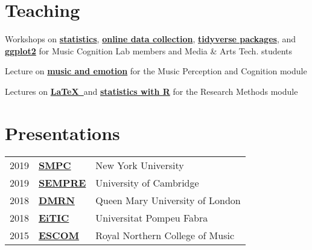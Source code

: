\documentclass[]{deedy-resume-openfont}
\begin{document}
\begin{minipage}[t]{0.66\textwidth}
\section{Teaching}
\begin{tightemize}
\item Workshops on \textbf{\href{https://github.com/remidefleurian/teaching/tree/master/lectures/intro-to-stats}{statistics}}, \textbf{\href{https://github.com/remidefleurian/teaching/tree/master/lectures/online-data-collection}{online data collection}}, \textbf{\href{https://github.com/remidefleurian/teaching/tree/master/lectures/intro-to-tidyverse}{tidyverse packages}}, and \textbf{\href{https://github.com/remidefleurian/teaching/tree/master/lectures/intro-to-ggplot2}{ggplot2}} for Music Cognition Lab members and Media \& Arts Tech. students
\end{tightemize}
\sectionsep

\begin{tightemize}
\item Lecture on \textbf{\href{https://github.com/remidefleurian/teaching/tree/master/lectures/music-and-emotion}{music and emotion}} for the Music Perception and Cognition module
\end{tightemize}
\sectionsep

\begin{tightemize}
\item Lectures on \textbf{\href{https://github.com/remidefleurian/teaching/tree/master/lectures/typesetting-with-latex}{\LaTeX\ }}and \textbf{\href{https://github.com/remidefleurian/teaching/tree/master/lectures/stats-with-r}{statistics with R}} for the Research Methods module
\end{tightemize}
\sectionsep

\section{Presentations} 
\begin{tabular}{rll}
2019 & \textbf{\href{https://remidefleurian.com/presentation/2019-smpc/}{SMPC}} & New York University \\
2019 & \textbf{\href{https://remidefleurian.com/presentation/2019-sempre/}{SEMPRE}} & University of Cambridge \\
2018 & \textbf{\href{https://remidefleurian.com/presentation/2018-dmrn/}{DMRN}} & Queen Mary University of London \\
2018 & \textbf{\href{https://remidefleurian.com/presentation/2018-eitic/}{EiTIC}} & Universitat Pompeu Fabra \\
2015 & \textbf{\href{https://remidefleurian.com/presentation/2015-escom/}{ESCOM}} & Royal Northern College of Music \\
\end{tabular}
\sectionsep


\end{minipage}
\end{document}

